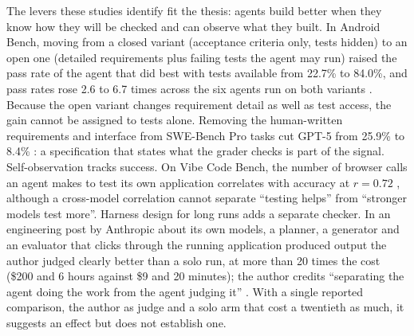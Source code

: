 The levers these studies identify fit the thesis: agents build better when they know how they will be checked and can observe what they built. In Android Bench, moving from a closed variant (acceptance criteria only, tests hidden) to an open one (detailed requirements plus failing tests the agent may run) raised the pass rate of the agent that did best with tests available from 22.7\% to 84.0\%, and pass rates rose 2.6 to 6.7 times across the six agents run on both variants \citep{C29}. Because the open variant changes requirement detail as well as test access, the gain cannot be assigned to tests alone. Removing the human-written requirements and interface from SWE-Bench Pro tasks cut GPT-5 from 25.9\% to 8.4\% \citep{C9}: a specification that states what the grader checks is part of the signal. Self-observation tracks success. On Vibe Code Bench, the number of browser calls an agent makes to test its own application correlates with accuracy at $r = 0.72$ \citep{C19}, although a cross-model correlation cannot separate ``testing helps'' from ``stronger models test more''. Harness design for long runs adds a separate checker. In an engineering post by Anthropic about its own models, a planner, a generator and an evaluator that clicks through the running application produced output the author judged clearly better than a solo run, at more than 20 times the cost (\$200 and 6 hours against \$9 and 20 minutes); the author credits ``separating the agent doing the work from the agent judging it'' \citep{T28}. With a single reported comparison, the author as judge and a solo arm that cost a twentieth as much, it suggests an effect but does not establish one.

